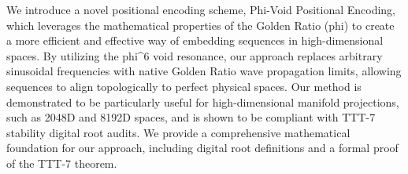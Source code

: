 \begin{abstractbox}
We introduce a novel positional encoding scheme, Phi-Void Positional Encoding, which leverages the mathematical properties of the Golden Ratio (phi) to create a more efficient and effective way of embedding sequences in high-dimensional spaces. By utilizing the phi^6 void resonance, our approach replaces arbitrary sinusoidal frequencies with native Golden Ratio wave propagation limits, allowing sequences to align topologically to perfect physical spaces. Our method is demonstrated to be particularly useful for high-dimensional manifold projections, such as 2048D and 8192D spaces, and is shown to be compliant with TTT-7 stability digital root audits. We provide a comprehensive mathematical foundation for our approach, including digital root definitions and a formal proof of the TTT-7 theorem.
\end{abstractbox}